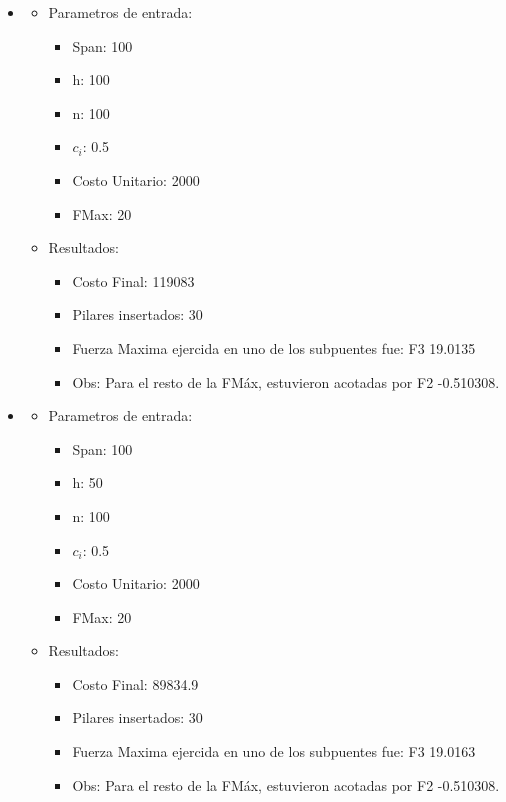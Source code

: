 \begin{itemize}
\begin{itemize}
\begin{itemize}
	  \end{itemize}
      \end{itemize}
\item
  \begin{itemize}
    \item Parametros de entrada:
	  \begin{itemize}
	    \item Span: 100
	    \item h: 100
	    \item n: 100
	    \item $c_i$: 0.5
	    \item Costo Unitario: 2000
	    \item FMax: 20
	  \end{itemize}
      \item Resultados:
	  \begin{itemize}
	    \item Costo Final: 119083
	    \item Pilares insertados: 30
	    \item Fuerza Maxima ejercida en uno de los subpuentes fue: F3 19.0135
	    \item Obs: Para el resto de la FM\'ax, estuvieron acotadas por F2 -0.510308.
	  \end{itemize}
      \end{itemize}
\item
  \begin{itemize}
    \item Parametros de entrada:
	  \begin{itemize}
	    \item Span: 100
	    \item h: 50
	    \item n: 100
	    \item $c_i$: 0.5
	    \item Costo Unitario: 2000
	    \item FMax: 20
	  \end{itemize}
      \item Resultados:
	  \begin{itemize}
	    \item Costo Final: 89834.9
	    \item Pilares insertados: 30
	    \item Fuerza Maxima ejercida en uno de los subpuentes fue: F3 19.0163
	    \item Obs: Para el resto de la FM\'ax, estuvieron acotadas por F2 -0.510308.
	  \end{itemize}

\end{itemize}
\end{itemize}
